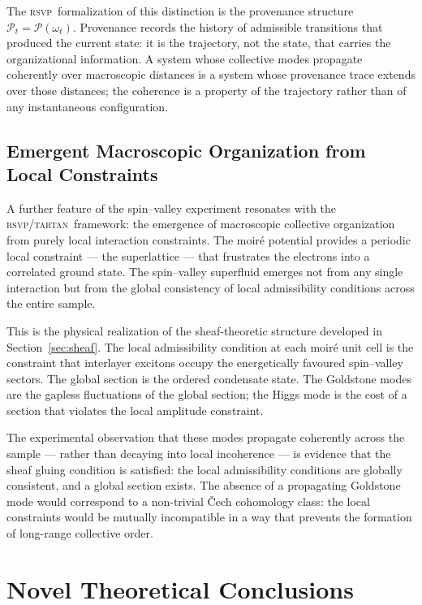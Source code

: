 \documentclass[11pt,a4paper]{article}
\theoremstyle{plain}
\theoremstyle{definition}
\theoremstyle{remark}
\newcommand{\Pp}{\mathcal{P}}
\newcommand{\RSVP}{\textup{\textsc{rsvp}}}
\newcommand{\TARTAN}{\textup{\textsc{tartan}}}
\begin{document}
The \RSVP\ formalization of this distinction is the provenance structure
$\Pp_t = \Pp(\omega_t)$. Provenance records the history of admissible
transitions that produced the current state: it is the trajectory, not
the state, that carries the organizational information. A system whose
collective modes propagate coherently over macroscopic distances is a
system whose provenance trace extends over those distances; the coherence
is a property of the trajectory rather than of any instantaneous
configuration.

\subsection{Emergent Macroscopic Organization from Local Constraints}

A further feature of the spin--valley experiment resonates with the
\RSVP/\TARTAN\ framework: the emergence of macroscopic collective
organization from purely local interaction constraints. The moiré potential
provides a periodic local constraint --- the superlattice --- that
frustrates the electrons into a correlated ground state. The spin--valley
superfluid emerges not from any single interaction but from the global
consistency of local admissibility conditions across the entire sample.

This is the physical realization of the sheaf-theoretic structure developed
in Section~\ref{sec:sheaf}. The local admissibility condition at each moiré
unit cell is the constraint that interlayer excitons occupy the
energetically favoured spin--valley sectors. The global section is the
ordered condensate state. The Goldstone modes are the gapless fluctuations
of the global section; the Higgs mode is the cost of a section that
violates the local amplitude constraint.

The experimental observation that these modes propagate coherently across
the sample --- rather than decaying into local incoherence --- is evidence
that the sheaf gluing condition is satisfied: the local admissibility
conditions are globally consistent, and a global section exists. The
absence of a propagating Goldstone mode would correspond to a non-trivial
\v{C}ech cohomology class: the local constraints would be mutually
incompatible in a way that prevents the formation of long-range collective
order.

\section{Novel Theoretical Conclusions}
\label{sec:novel}
\end{document}
